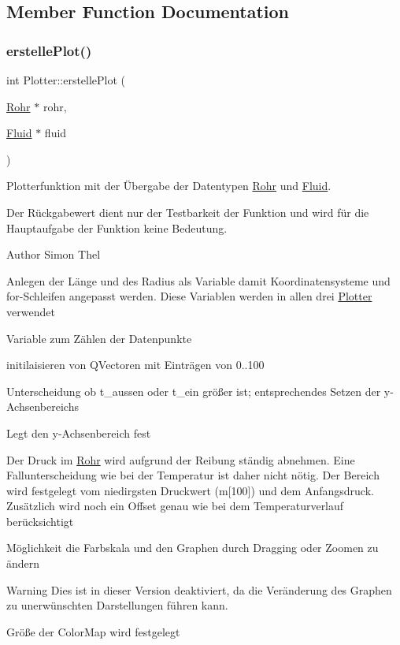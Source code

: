 \subsection{Member Function Documentation}
\mbox{\label{class_plotter_a4808217f2ec95082cee4c239b707fcc3}} 
\subsubsection{\texorpdfstring{erstelle\+Plot()}{erstellePlot()}}
{\footnotesize\ttfamily int Plotter\+::erstelle\+Plot (\begin{DoxyParamCaption}\item[{\hyperlink{class_rohr}{Rohr} $\ast$}]{rohr,  }\item[{\hyperlink{class_fluid}{Fluid} $\ast$}]{fluid }\end{DoxyParamCaption})}



Plotterfunktion mit der Übergabe der Datentypen \hyperlink{class_rohr}{Rohr} und \hyperlink{class_fluid}{Fluid}. 

Der Rückgabewert dient nur der Testbarkeit der Funktion und wird für die Hauptaufgabe der Funktion keine Bedeutung.\begin{DoxyAuthor}{Author}
Simon Thel 
\end{DoxyAuthor}
Anlegen der Länge und des Radius als Variable damit Koordinatensysteme und for-\/\+Schleifen angepasst werden. Diese Variablen werden in allen drei \hyperlink{class_plotter}{Plotter} verwendet

Variable zum Zählen der Datenpunkte

initilaisieren von Q\+Vectoren mit Einträgen von 0..100

Unterscheidung ob t\+\_\+aussen oder t\+\_\+ein größer ist; entsprechendes Setzen der y-\/\+Achsenbereichs

Legt den y-\/\+Achsenbereich fest

Der Druck im \hyperlink{class_rohr}{Rohr} wird aufgrund der Reibung ständig abnehmen. Eine Fallunterscheidung wie bei der Temperatur ist daher nicht nötig. Der Bereich wird festgelegt vom niedirgsten Druckwert (m\mbox{[}100\mbox{]}) und dem Anfangsdruck. Zusätzlich wird noch ein Offset genau wie bei dem Temperaturverlauf berücksichtigt

Möglichkeit die Farbskala und den Graphen durch Dragging oder Zoomen zu ändern \begin{DoxyWarning}{Warning}
Dies ist in dieser Version deaktiviert, da die Veränderung des Graphen zu unerwünschten Darstellungen führen kann.
\end{DoxyWarning}
Größe der Color\+Map wird festgelegt

